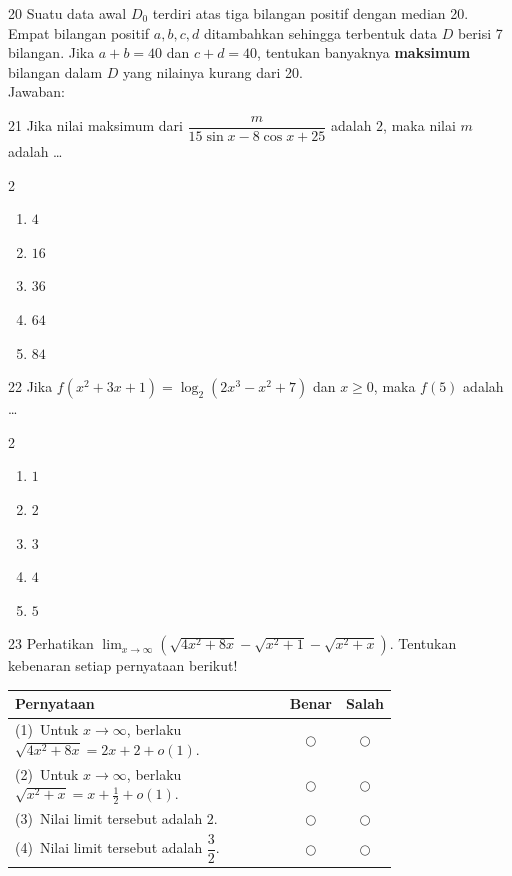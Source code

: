 \documentclass[11pt]{article}
\newenvironment{pilB}{%
  \par\smallskip\begin{multicols}{2}
  \begin{enumerate}[label=(\Alph*),leftmargin=*,itemsep=1pt,topsep=3pt]}%
  {\end{enumerate}\end{multicols}}
\begin{document}
\begin{soal}{20}
Suatu data awal $D_0$ terdiri atas tiga bilangan positif dengan median
20. Empat bilangan positif $a,b,c,d$ ditambahkan sehingga terbentuk
data $D$ berisi 7 bilangan. Jika $a+b=40$ dan $c+d=40$, tentukan
banyaknya \textbf{maksimum} bilangan dalam $D$ yang nilainya kurang
dari 20.\\[0.4em]
Jawaban:\enspace\underline{\hspace{4cm}}
\end{soal}


\begin{soal}{21}
Jika nilai maksimum dari $\dfrac{m}{15\sin x-8\cos x+25}$ adalah $2$,
maka nilai $m$ adalah \ldots
\begin{pilB}
  \item $4$ \item $16$ \item $36$ \item $64$ \item $84$
\end{pilB}
\end{soal}

\begin{soal}{22}
Jika $f(x^2+3x+1)=\log_2(2x^3-x^2+7)$ dan $x\geq0$, maka $f(5)$
adalah \ldots
\begin{pilB}
  \item $1$ \item $2$ \item $3$ \item $4$ \item $5$
\end{pilB}
\end{soal}

\begin{soal}{23}
Perhatikan $\displaystyle\lim_{x\to\infty}
\!\left(\sqrt{4x^2+8x}-\sqrt{x^2+1}-\sqrt{x^2+x}\right)$.
Tentukan kebenaran setiap pernyataan berikut!

\par\smallskip
{\renewcommand{\arraystretch}{1.4}%
\begin{tabular}{@{}p{0.76\linewidth}cc@{}}
\hline
\textbf{Pernyataan} & \textbf{Benar} & \textbf{Salah}\\
\hline
(1)~Untuk $x\to\infty$, berlaku $\sqrt{4x^2+8x}=2x+2+o(1)$.
  & $\bigcirc$ & $\bigcirc$\\
(2)~Untuk $x\to\infty$, berlaku $\sqrt{x^2+x}=x+\tfrac{1}{2}+o(1)$.
  & $\bigcirc$ & $\bigcirc$\\
(3)~Nilai limit tersebut adalah $2$.
  & $\bigcirc$ & $\bigcirc$\\
(4)~Nilai limit tersebut adalah $\dfrac{3}{2}$.
  & $\bigcirc$ & $\bigcirc$\\
\hline
\end{tabular}}
\end{soal}
\end{document}
